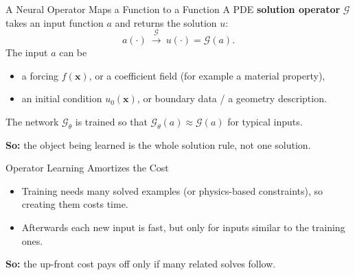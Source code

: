 \documentclass{ntuabeamer}
\begin{document}
\begin{frame}{A Neural Operator Maps a Function to a Function}
  A PDE \textbf{solution operator} \(\mathcal G\) takes an input function \(a\) and returns the solution \(u\):
  \[
    \boxed{a(\cdot)\ \xrightarrow{\ \mathcal G\ }\ u(\cdot)=\mathcal G(a)}.
  \]
  The input \(a\) can be
  \begin{itemize}
    \item a forcing \(f(\mathbf x)\), or a coefficient field (for example a material property),
    \item an initial condition \(u_0(\mathbf x)\), or boundary data / a geometry description.
  \end{itemize}
  The network \(\mathcal G_\theta\) is trained so that \(\mathcal G_\theta(a)\approx\mathcal G(a)\) for typical inputs.

  \medskip
  \textbf{So:} the object being learned is the whole solution rule, not one solution.
\end{frame}

\begin{frame}{Operator Learning Amortizes the Cost}
  \centering

  \raggedright
  \vspace{0.3cm}
  \begin{itemize}
    \item Training needs many solved examples (or physics-based constraints), so creating them costs time.
    \item Afterwards each new input is fast, but only for inputs similar to the training ones.
  \end{itemize}
  \textbf{So:} the up-front cost pays off only if many related solves follow.
\end{frame}
\end{document}
